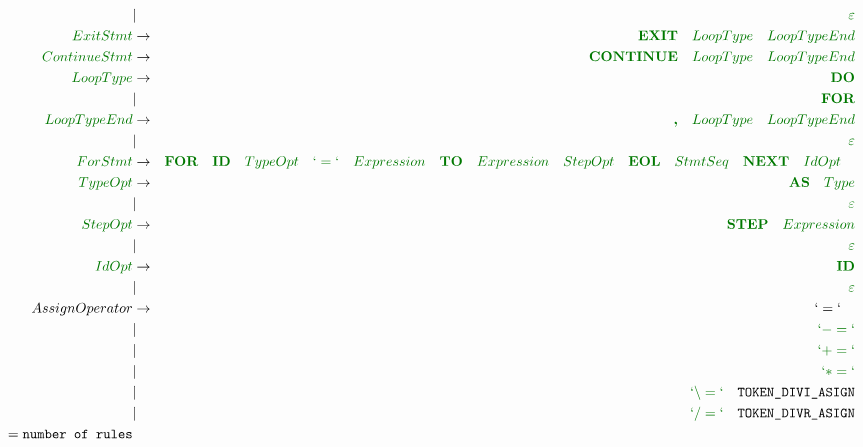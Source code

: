 \documentclass[a4paper,11pt,landscape,leqno]{article}
\begin{document}
\begin{eqnarray}
&	|	&\textcolor{green1}{\varepsilon}  \\
\textcolor{green1}{ExitStmt} & \rightarrow & \textcolor{green1}{\textbf{EXIT}\quad LoopType\quad LoopTypeEnd}	\\
\textcolor{green1}{ContinueStmt} & \rightarrow & \textcolor{green1}{\textbf{CONTINUE}\quad LoopType\quad LoopTypeEnd}	\\
\textcolor{green1}{LoopType} & \rightarrow & \textcolor{green1}{\textbf{DO}}\\
&	|		&	\textcolor{green1}{\textbf{FOR}}   \\
\textcolor{green1}{LoopTypeEnd} & \rightarrow & \textcolor{green1}{\textbf{,}\quad LoopType \quad LoopTypeEnd}\\
&	|		&	\textcolor{green1}{\varepsilon}   \\
\textcolor{green1}{ForStmt} &	 \rightarrow	&  \textcolor{green1}{\textbf{FOR}\quad \textbf{ID}\quad TypeOpt\quad `=`\quad Expression\quad \textbf{TO}\quad Expression\quad StepOpt\quad \textbf{EOL}\quad StmtSeq\quad \textbf{NEXT}\quad IdOpt\quad} \\
\textcolor{green1}{TypeOpt} & \rightarrow  & \textcolor{green1}{\textbf{AS}\quad Type} \\
& | &	\textcolor{green1}{\varepsilon} \\
\textcolor{green1}{StepOpt} & \rightarrow  & \textcolor{green1}{\textbf{STEP}\quad Expression} \\
& | &	\textcolor{green1}{\varepsilon} \\
\textcolor{green1}{IdOpt}	& \rightarrow & \textcolor{green1}{\textbf{ID}} \\
		& | &  \textcolor{green1}{\varepsilon} \\
AssignOperator	&	 \rightarrow	&	 `=` \quad		\\
		&	|		&	\textcolor{green1}{`-=`}	\\
		&	|		&	\textcolor{green1}{`+=`}	\\
		&	|		&	\textcolor{green1}{`*=`}	\\
		&	|		&	\textcolor{green1}{`\backslash =`}\quad \textrm{\texttt{TOKEN\_DIVI\_ASIGN}}	\\
		&	|		&	\textcolor{green1}{`/=`}\quad \textrm{\texttt{TOKEN\_DIVR\_ASIGN}}\\
 = \textrm{\texttt{number of rules}} & & 
\end{eqnarray}
\end{document}
